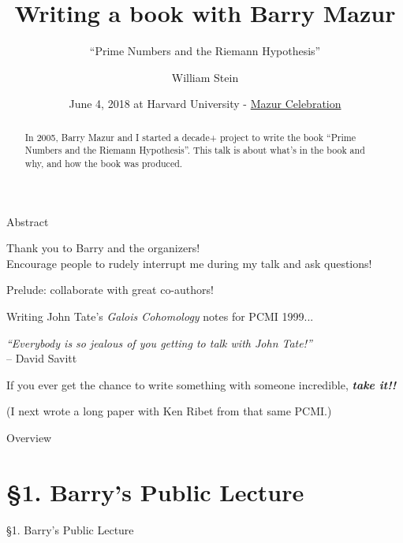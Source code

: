 \documentclass{beamer}
\title{Writing a book with Barry Mazur}
\subtitle{``Prime Numbers and the Riemann Hypothesis''}
\author[W.\thinspace{}Stein]{William Stein}
\date[Mazur 80]{June 4, 2018 at Harvard University - \href{http://www.math.harvard.edu/conferences/mazur18/}{Mazur Celebration}}
\institute[SageMath, Inc. \& UW]{SageMath, Inc. and University of Washington}
\newcommand{\mysection}[2]{\section{\S#1. #2}%
\begin{frame}{}
\vfill
\begin{center}
\hrulefill
\vfill
\Huge\sc \S#1. #2
\vfill
\hrulefill
\end{center}
\vfill
\end{frame}}
\begin{document}
\begin{frame}
  \titlepage
\end{frame}

\begin{frame}{Abstract}
  \begin{abstract}
    In 2005, Barry Mazur and I started a decade+ project to write the
    book ``Prime Numbers and the Riemann Hypothesis''.
    This talk is about
    what's in the book and why, and how the book was produced.
  \end{abstract}

  \vfill
  \hrulefill

  {\tiny Thank you to Barry and the organizers!}\\
    {\tiny Encourage people to rudely interrupt me during my talk and ask questions!}

\end{frame}

\begin{frame}{Prelude: collaborate with great co-authors!}

  Writing John Tate's {\em Galois Cohomology} notes for PCMI 1999...

  \vfill

  \begin{block}{}
    {\em
      ``Everybody is so jealous of you getting
      to talk with John Tate!''}\\
    -- David Savitt
  \end{block}

  \vfill

  If you ever get the chance
  to write something with someone incredible,
  {\bf\em take it!!}

  \vfill

  (I next wrote a long paper with Ken Ribet from that same PCMI.)

\end{frame}


\begin{frame}{Overview}
  \tableofcontents
\end{frame}

\mysection{1}{Barry's Public Lecture}
\end{document}
